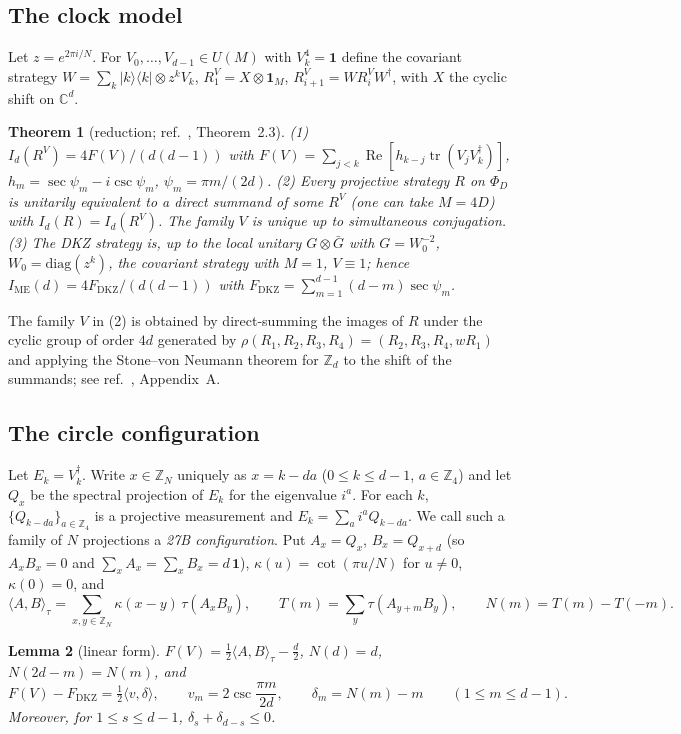 \documentclass[11pt]{amsart}
\newtheorem{theorem}{Theorem}[section]
\newtheorem{lemma}[theorem]{Lemma}
\theoremstyle{definition}
\theoremstyle{remark}
\numberwithin{equation}{section}
\newcommand{\C}{\mathbb{C}}
\newcommand{\Z}{\mathbb{Z}}
\newcommand{\tr}{\operatorname{tr}}
\newcommand{\one}{\mathbf{1}}
\newcommand{\IME}{I_{\mathrm{ME}}}
\newcommand{\FD}{F_{\mathrm{DKZ}}}
\renewcommand{\Re}{\operatorname{Re}}
\begin{document}
\subsection{The clock model}
Let $z=e^{2\pi i/N}$. For $V_0,\dots,V_{d-1}\in U(M)$ with $V_k^4=\one$ define the covariant strategy
$W=\sum_k|k\rangle\langle k|\otimes z^kV_k$, $R^V_1=X\otimes\one_M$, $R^V_{i+1}=WR^V_iW^\dagger$, with $X$ the cyclic
shift on $\C^d$.

\begin{theorem}[reduction; ref.~\cite{classical}, Theorem~2.3]\label{thm:reduction}
(1) $I_d(R^V)=4F(V)/(d(d-1))$ with $F(V)=\sum_{j<k}\Re[h_{k-j}\tr(V_jV_k^\dagger)]$, $h_m=\sec\psi_m-i\csc\psi_m$,
$\psi_m=\pi m/(2d)$. (2) Every projective strategy $R$ on $\Phi_D$ is unitarily equivalent to a direct summand of some
$R^V$ (one can take $M=4D$) with $I_d(R)=I_d(R^V)$. The family $V$ is unique up to simultaneous conjugation.
(3) The DKZ strategy is, up to the local unitary $G\otimes\bar G$ with $G=W_0^{-2}$, $W_0=\mathrm{diag}(z^k)$, the
covariant strategy with $M=1$, $V\equiv1$; hence $\IME(d)=4\FD/(d(d-1))$ with $\FD=\sum_{m=1}^{d-1}(d-m)\sec\psi_m$.
\end{theorem}

The family $V$ in (2) is obtained by direct-summing the images of $R$ under the cyclic group of order $4d$ generated by
$\rho(R_1,R_2,R_3,R_4)=(R_2,R_3,R_4,wR_1)$ and applying the Stone--von Neumann theorem for $\Z_d$ to the shift of the
summands; see ref.~\cite{classical}, Appendix~A.

\subsection{The circle configuration}
Let $E_k=V_k^\dagger$. Write $x\in\Z_N$ uniquely as $x=k-da$ ($0\le k\le d-1$, $a\in\Z_4$) and let $Q_x$ be the spectral
projection of $E_k$ for the eigenvalue $i^a$. For each $k$, $\{Q_{k-da}\}_{a\in\Z_4}$ is a projective measurement and
$E_k=\sum_ai^aQ_{k-da}$. We call such a family of $N$ projections a \emph{27B configuration}. Put $A_x=Q_x$,
$B_x=Q_{x+d}$ (so $A_xB_x=0$ and $\sum_xA_x=\sum_xB_x=d\,\one$), $\kappa(u)=\cot(\pi u/N)$ for $u\ne0$, $\kappa(0)=0$, and
\[
\langle A,B\rangle_\tau=\sum_{x,y\in\Z_N}\kappa(x-y)\,\tau(A_xB_y),\qquad T(m)=\sum_y\tau(A_{y+m}B_y),\qquad N(m)=T(m)-T(-m).
\]

\begin{lemma}[linear form]\label{lem:linear}
$F(V)=\frac12\langle A,B\rangle_\tau-\frac d2$, $N(d)=d$, $N(2d-m)=N(m)$, and
\[
F(V)-\FD=\tfrac12\langle v,\delta\rangle,\qquad v_m=2\csc\frac{\pi m}{2d},\qquad \delta_m=N(m)-m\qquad(1\le m\le d-1).
\]
Moreover, for $1\le s\le d-1$, $\delta_s+\delta_{d-s}\le0$.
\end{lemma}
\end{document}
